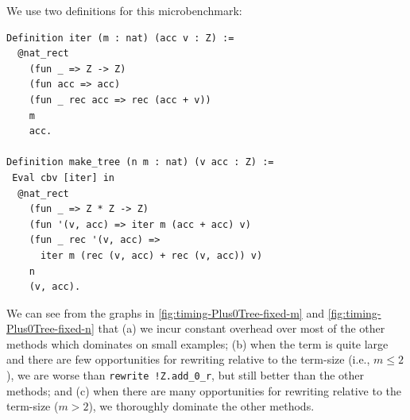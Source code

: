 \begin{subappendices}
We use two definitions for this microbenchmark:
\begin{verbatim}
Definition iter (m : nat) (acc v : Z) :=
  @nat_rect
    (fun _ => Z -> Z)
    (fun acc => acc)
    (fun _ rec acc => rec (acc + v))
    m
    acc.

Definition make_tree (n m : nat) (v acc : Z) :=
 Eval cbv [iter] in
  @nat_rect
    (fun _ => Z * Z -> Z)
    (fun '(v, acc) => iter m (acc + acc) v)
    (fun _ rec '(v, acc) =>
      iter m (rec (v, acc) + rec (v, acc)) v)
    n
    (v, acc).
\end{verbatim}

We can see from the graphs in \autoref{fig:timing-Plus0Tree-fixed-m} and \autoref{fig:timing-Plus0Tree-fixed-n} that
(a) we incur constant overhead over most of the other methods which dominates on small examples;
(b) when the term is quite large and there are few opportunities for rewriting relative to the term-size (i.e., $m \le 2$), we are worse than \texttt{rewrite !Z.add_0_r}, but still better than the other methods; and
(c) when there are many opportunities for rewriting relative to the term-size ($m > 2$), we thoroughly dominate the other methods.



\end{subappendices}
